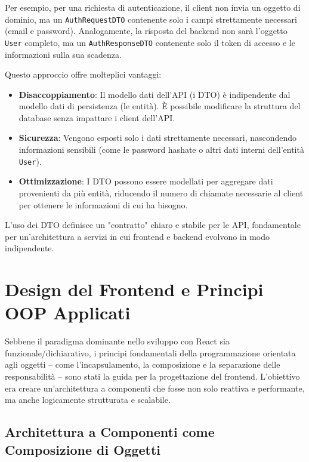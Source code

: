 \documentclass[12pt,a4paper,openright,twoside]{book}
\begin{document}
Per esempio, per una richiesta di autenticazione, il client non invia un oggetto di dominio, ma un \texttt{AuthRequestDTO} contenente solo i campi strettamente necessari (email e password). Analogamente, la risposta del backend non sarà l'oggetto \texttt{User} completo, ma un \texttt{AuthResponseDTO} contenente solo il token di accesso e le informazioni sulla sua scadenza.

Questo approccio offre molteplici vantaggi:
\begin{itemize}
    \item \textbf{Disaccoppiamento}: Il modello dati dell'API (i DTO) è indipendente dal modello dati di persistenza (le entità). È possibile modificare la struttura del database senza impattare i client dell'API.
    \item \textbf{Sicurezza}: Vengono esposti solo i dati strettamente necessari, nascondendo informazioni sensibili (come le password hashate o altri dati interni dell'entità \texttt{User}).
    \item \textbf{Ottimizzazione}: I DTO possono essere modellati per aggregare dati provenienti da più entità, riducendo il numero di chiamate necessarie al client per ottenere le informazioni di cui ha bisogno.
\end{itemize}

L'uso dei DTO definisce un "contratto" chiaro e stabile per le API, fondamentale per un'architettura a servizi in cui frontend e backend evolvono in modo indipendente.

\section{Design del Frontend e Principi OOP Applicati}
\label{sec:design_frontend}

Sebbene il paradigma dominante nello sviluppo con React sia funzionale/dichiarativo, i principi fondamentali della programmazione orientata agli oggetti -- come l'incapsulamento, la composizione e la separazione delle responsabilità -- sono stati la guida per la progettazione del frontend. L'obiettivo era creare un'architettura a componenti che fosse non solo reattiva e performante, ma anche logicamente strutturata e scalabile.

\subsection{Architettura a Componenti come Composizione di Oggetti}
\label{subsec:design_component_composition}
\end{document}
